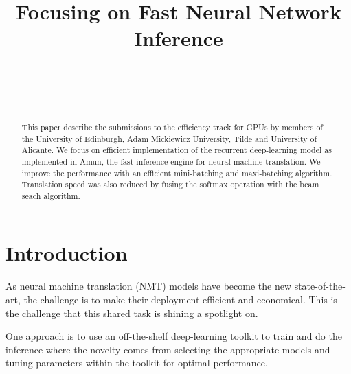 \documentclass[11pt,a4paper]{article}
\begin{document}
\title{\bf Focusing on Fast Neural Network Inference}  

\author{ \hfill  {}\\ 
        \addr{}
\AND
        \hfill {}\\
\AND
        \hfill {}\\
}

\maketitle
\pagestyle{empty}

\begin{abstract}

This paper describe the submissions to the efficiency track for GPUs by members of the University of Edinburgh, Adam Mickiewicz University, Tilde and University of Alicante. We focus on efficient implementation of the recurrent deep-learning model as implemented in Amun, the fast inference engine for neural machine translation. We improve the performance with an efficient mini-batching and maxi-batching algorithm. Translation speed was also reduced by fusing the softmax operation with the beam seach algorithm.


\end{abstract}

\section{Introduction}
\label{sec:Introduction}

As neural machine translation (NMT) models have become the new state-of-the-art, the challenge is to make their deployment efficient and economical. This is the challenge that this shared task is shining a spotlight on.

One approach is to use an off-the-shelf deep-learning toolkit to train and do the inference where the novelty comes from selecting the appropriate models and tuning parameters within the toolkit for optimal performance. %
\end{document}
